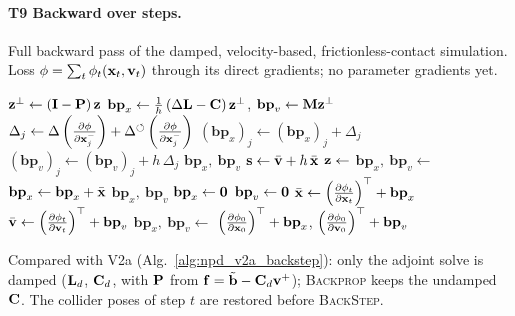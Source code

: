 \paragraph{T9 Backward over steps.}\mbox{}
\newline Full backward pass of the damped, velocity-based, frictionless-contact simulation. Loss $\phi = \sum_t\phi_t(\mathbf{x}_t, \mathbf{v}_t)$ through its direct gradients; no parameter gradients yet.
\begin{algorithm}[H]
\caption{D: backward pass over all steps (initial-state gradients).}
\label{alg:npd_d_backward}
\begin{algorithmic}[1]
    \State $\mathbf{z}^\perp \gets \left(\mathbf{I} - \mathbf{P}\right)\mathbf{z}$
    \State $\mathbf{bp}_x \gets \tfrac{1}{h}\left(\Delta\mathbf{L} - \mathbf{C}\right)\mathbf{z}^\perp$, \quad $\mathbf{bp}_v \gets \mathbf{M}\mathbf{z}^\perp$ 
        \State $\Delta_j \gets \Delta\left(\frac{\partial \phi}{\partial \mathbf{x}_j^-}\right) + \Delta^\circlearrowleft\left(\frac{\partial \phi}{\partial \mathbf{x}_j^-}\right)$ 
        \State $\left(\mathbf{bp}_x\right)_j \gets \left(\mathbf{bp}_x\right)_j + \Delta_j$
        \State $\left(\mathbf{bp}_v\right)_j \gets \left(\mathbf{bp}_v\right)_j + h\,\Delta_j$
    \EndFor
    \State \Return $\mathbf{bp}_x,\ \mathbf{bp}_v$
\EndFunction
\Statex
{}
    \State $\mathbf{s} \gets \bar{\mathbf{v}} + h\,\bar{\mathbf{x}}$ 
    \State $\mathbf{z} \gets$  
    \State $\mathbf{bp}_x,\ \mathbf{bp}_v \gets$ 
    \State $\mathbf{bp}_x \gets \mathbf{bp}_x + \bar{\mathbf{x}}$ 
    \State \Return $\mathbf{bp}_x,\ \mathbf{bp}_v$
\EndFunction
\Statex
{}
    \State $\mathbf{bp}_x \gets \mathbf{0}$
    \State $\mathbf{bp}_v \gets \mathbf{0}$
        \State $\bar{\mathbf{x}} \gets \left(\frac{\partial \phi_t}{\partial \mathbf{x}_t}\right)^\top + \mathbf{bp}_x$
        \State $\bar{\mathbf{v}} \gets \left(\frac{\partial \phi_t}{\partial \mathbf{v}_t}\right)^\top + \mathbf{bp}_v$
        \State $\mathbf{bp}_x,\ \mathbf{bp}_v \gets$  
    \EndFor
    \State \Return $\left(\frac{\partial \phi_0}{\partial \mathbf{x}_0}\right)^\top + \mathbf{bp}_x$, \quad $\left(\frac{\partial \phi_0}{\partial \mathbf{v}_0}\right)^\top + \mathbf{bp}_v$
\EndFunction
\end{algorithmic}
\end{algorithm}
\noindent Compared with V2a (Alg.~\ref{alg:npd_v2a_backstep}): only the adjoint solve is damped ($\mathbf{L}_d$, $\mathbf{C}_d$, with $\mathbf{P}$ from $\mathbf{f} = \tilde{\mathbf{b}} - \mathbf{C}_d\mathbf{v}^+$); \textsc{Backprop} keeps the undamped $\mathbf{C}$. The collider poses of step $t$ are restored before \textsc{BackStep}.

